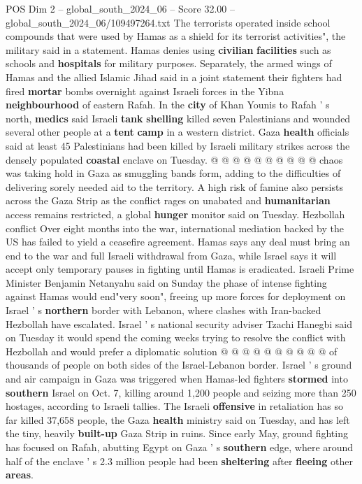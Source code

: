 \begin{textsample}{POS Dim 2 – global\_south\_2024\_06 – Score 32.00 – global\_south\_2024\_06/109497264.txt}
The terrorists operated inside school compounds that were used by Hamas as a shield for its terrorist activities", the military said in a statement.
Hamas denies using \textbf{civilian} \textbf{facilities} such as schools and \textbf{hospitals} for military purposes.
Separately, the armed wings of Hamas and the allied Islamic Jihad said in a joint statement their fighters had fired \textbf{mortar} bombs overnight against Israeli forces in the Yibna \textbf{neighbourhood} of eastern Rafah.
In the \textbf{city} of Khan Younis to Rafah ' s north, \textbf{medics} said Israeli \textbf{tank} \textbf{shelling} killed seven Palestinians and wounded several other people at a \textbf{tent} \textbf{camp} in a western district.
Gaza \textbf{health} officials said at least 45 Palestinians had been killed by Israeli military strikes across the densely populated \textbf{coastal} enclave on Tuesday. @ @ @ @ @ @ @ @ @ @ chaos was taking hold in Gaza as smuggling bands form, adding to the difficulties of delivering sorely needed aid to the territory.
A high risk of famine also persists across the Gaza Strip as the conflict rages on unabated and \textbf{humanitarian} access remains restricted, a global \textbf{hunger} monitor said on Tuesday.
Hezbollah conflict Over eight months into the war, international mediation backed by the US has failed to yield a ceasefire agreement.
Hamas says any deal must bring an end to the war and full Israeli withdrawal from Gaza, while Israel says it will accept only temporary pauses in fighting until Hamas is eradicated.
Israeli Prime Minister Benjamin Netanyahu said on Sunday the phase of intense fighting against Hamas would end"very soon", freeing up more forces for deployment on Israel ' s \textbf{northern} border with Lebanon, where clashes with Iran-backed Hezbollah have escalated.
Israel ' s national security adviser Tzachi Hanegbi said on Tuesday it would spend the coming weeks trying to resolve the conflict with Hezbollah and would prefer a diplomatic solution @ @ @ @ @ @ @ @ @ @ of thousands of people on both sides of the Israel-Lebanon border.
Israel ' s ground and air campaign in Gaza was triggered when Hamas-led fighters \textbf{stormed} into \textbf{southern} Israel on Oct. 7, killing around 1,200 people and seizing more than 250 hostages, according to Israeli tallies.
The Israeli \textbf{offensive} in retaliation has so far killed 37,658 people, the Gaza \textbf{health} ministry said on Tuesday, and has left the tiny, heavily \textbf{built-up} Gaza Strip in ruins.
Since early May, ground fighting has focused on Rafah, abutting Egypt on Gaza ' s \textbf{southern} edge, where around half of the enclave ' s 2.3 million people had been \textbf{sheltering} after \textbf{fleeing} other \textbf{areas}.

\end{textsample}
